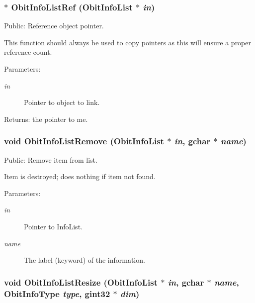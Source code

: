 \subsubsection{$\ast$ Obit\-Info\-List\-Ref ({\bf Obit\-Info\-List} $\ast$ {\em in})}\label{ObitInfoList_8c_a5}


Public: Reference object pointer. 

This function should always be used to copy pointers as this will ensure a proper reference count. \begin{Desc}
\item[Parameters:]
\begin{description}
\item[{\em in}]Pointer to object to link. \end{description}
\end{Desc}
\begin{Desc}
\item[Returns:]the pointer to me. \end{Desc}
\subsubsection{\setlength{\rightskip}{0pt plus 5cm}void Obit\-Info\-List\-Remove ({\bf Obit\-Info\-List} $\ast$ {\em in}, gchar $\ast$ {\em name})}\label{ObitInfoList_8c_a20}


Public: Remove item from list. 

Item is destroyed; does nothing if item not found. \begin{Desc}
\item[Parameters:]
\begin{description}
\item[{\em in}]Pointer to Info\-List. \item[{\em name}]The label (keyword) of the information. \end{description}
\end{Desc}
\subsubsection{\setlength{\rightskip}{0pt plus 5cm}void Obit\-Info\-List\-Resize ({\bf Obit\-Info\-List} $\ast$ {\em in}, gchar $\ast$ {\em name}, Obit\-Info\-Type {\em type}, gint32 $\ast$ {\em dim})}\label{ObitInfoList_8c_a21}


